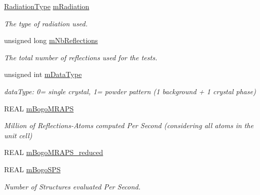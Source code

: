\begin{DoxyCompactItemize}
\mbox{\hyperlink{namespace_obj_cryst_a48fe50a094c607f8897378934d3d73ef}{Radiation\+Type}} \mbox{\hyperlink{struct_obj_cryst_1_1_speed_test_report_a9407361e047413bd993828c9cfca4cdf}{m\+Radiation}}
\begin{DoxyCompactList}\small\item\em The type of radiation used. \end{DoxyCompactList}\item 
\mbox{\label{struct_obj_cryst_1_1_speed_test_report_a4fde54cf3f02e5f564df92cc8eabd36e}} 
unsigned long \mbox{\hyperlink{struct_obj_cryst_1_1_speed_test_report_a4fde54cf3f02e5f564df92cc8eabd36e}{m\+Nb\+Reflections}}
\begin{DoxyCompactList}\small\item\em The total number of reflections used for the tests. \end{DoxyCompactList}\item 
\mbox{\label{struct_obj_cryst_1_1_speed_test_report_af3bb170b1d4ae3e1b484704b6c3d923c}} 
unsigned int \mbox{\hyperlink{struct_obj_cryst_1_1_speed_test_report_af3bb170b1d4ae3e1b484704b6c3d923c}{m\+Data\+Type}}
\begin{DoxyCompactList}\small\item\em data\+Type\+: 0= single crystal, 1= powder pattern (1 background + 1 crystal phase) \end{DoxyCompactList}\item 
\mbox{\label{struct_obj_cryst_1_1_speed_test_report_ac7497f01fce186e1370bffdbc2f6433c}} 
R\+E\+AL \mbox{\hyperlink{struct_obj_cryst_1_1_speed_test_report_ac7497f01fce186e1370bffdbc2f6433c}{m\+Bogo\+M\+R\+A\+PS}}
\begin{DoxyCompactList}\small\item\em Million of Reflections-\/\+Atoms computed Per Second (considering all atoms in the unit cell) \end{DoxyCompactList}\item 
R\+E\+AL \mbox{\hyperlink{struct_obj_cryst_1_1_speed_test_report_a76d9645d24f787e53856512fbb918603}{m\+Bogo\+M\+R\+A\+P\+S\+\_\+reduced}}
\item 
\mbox{\label{struct_obj_cryst_1_1_speed_test_report_ab45c0262f0cad316b2f3e8e74a8a5fd4}} 
R\+E\+AL \mbox{\hyperlink{struct_obj_cryst_1_1_speed_test_report_ab45c0262f0cad316b2f3e8e74a8a5fd4}{m\+Bogo\+S\+PS}}
\begin{DoxyCompactList}\small\item\em Number of Structures evaluated Per Second. \end{DoxyCompactList}\end{DoxyCompactItemize}


